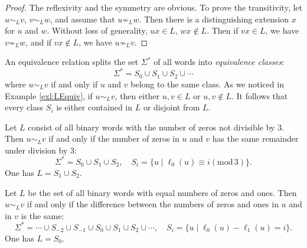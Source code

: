 \begin{page}
\setcounter{section}{4}
\setcounter{subsection}{1}
\setcounter{dfn}{3}
\label{portion:1181}

\begin{proof}
The reflexivity and the symmetry are obvious.
To prove the transitivity, let $u \sim_L v$, $v \sim_L w$, and assume that $u \not\sim_L w$.
Then there is a distinguishing extension $x$ for $u$ and $w$.
Without loss of generality, $ux \in L$, $wx \notin L$.
Then if $vx \in L$, we have $v \not\sim_L w$, and if $vx \notin L$, we have $u \not\sim_L v$.
\end{proof}

An equivalence relation splits the set $\Sigma^*$ of all words into \emph{equivalence classes}:
\begin{equation}
\label{eqn:SigmaEqClasses}
\Sigma^* = S_0 \cup S_1 \cup S_2 \cup \cdots
\end{equation}
where $u \sim_L v$ if and only if $u$ and $v$ belong to the same class.
As we noticed in Example \ref{exl:LEquiv}, if $u \sim_L v$, then either $u,v \in L$ or $u,v \notin L$.
It follows that every class $S_i$ is either contained in $L$ or disjoint from $L$.


\end{page}

\begin{page}
\setcounter{section}{4}
\setcounter{subsection}{1}
\setcounter{dfn}{4}
\label{portion:1183}

\begin{exl}
Let $L$ consist of all binary words with the number of zeros not divisible by $3$.
Then $u \sim_L v$ if and only if the number of zeros in $u$ and $v$ has the same remainder under division by $3$:
\[
\Sigma^* = S_0 \cup S_1 \cup S_2, \quad S_i = \{u \mid \ell_0(u) \equiv i (\mathrm{mod}\, 3)\}.
\]
One has $L = S_1 \cup S_2$.
\end{exl}

\end{page}

\begin{page}
\setcounter{section}{4}
\setcounter{subsection}{1}
\setcounter{dfn}{5}
\label{portion:1186}

\begin{exl}
Let $L$ be the set of all binary words with equal numbers of zeros and ones.
Then $u \sim_L v$ if and only if the difference between the numbers of zeros and ones in $u$ and in $v$ is the same:
\[
\Sigma^* = \cdots \cup S_{-2} \cup S_{-1} \cup S_0 \cup S_1 \cup S_2 \cup \cdots, \quad S_i = \{u \mid \ell_0(u) - \ell_1(u) = i\}.
\]
One has $L = S_0$.
\end{exl}

\end{page}

